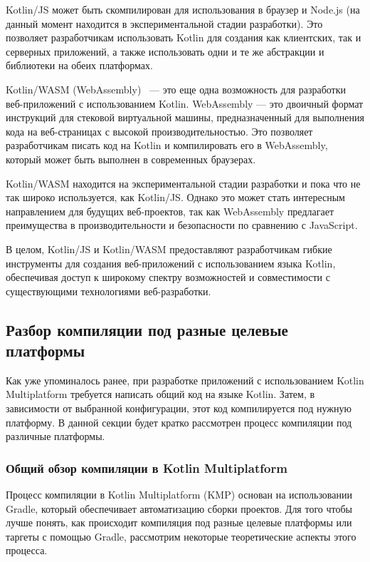 \documentclass[14pt, russian]{scrartcl}
\begin{document}
Kotlin/JS может быть скомпилирован для использования в браузер и Node.js (на данный момент находится в экспериментальной стадии разработки). Это позволяет разработчикам использовать Kotlin для создания как клиентских, так и серверных приложений, а также использовать одни и те же абстракции и библиотеки на обеих платформах.

Kotlin/WASM (WebAssembly)~\cite{KotlinWASM} --- это еще одна возможность для разработки веб-приложений с использованием Kotlin. WebAssembly --- это двоичный формат инструкций для стековой виртуальной машины, предназначенный для выполнения кода на веб-страницах с высокой производительностью. Это позволяет разработчикам писать код на Kotlin и компилировать его в WebAssembly, который может быть выполнен в современных браузерах.

Kotlin/WASM находится на экспериментальной стадии разработки и пока что не так широко используется, как Kotlin/JS. Однако это может стать интересным направлением для будущих веб-проектов, так как WebAssembly предлагает преимущества в производительности и безопасности по сравнению с JavaScript.

В целом, Kotlin/JS и Kotlin/WASM предоставляют разработчикам гибкие инструменты для создания веб-приложений с использованием языка Kotlin, обеспечивая доступ к широкому спектру возможностей и совместимости с существующими технологиями веб-разработки.

\subsection{Разбор компиляции под разные целевые платформы}

Как уже упоминалось ранее, при разработке приложений с использованием Kotlin Multiplatform требуется написать общий код на языке Kotlin. Затем, в зависимости от выбранной конфигурации, этот код компилируется под нужную платформу. В данной секции будет кратко рассмотрен процесс компиляции под различные платформы.

\subsubsection{Общий обзор компиляции в Kotlin Multiplatform}

Процесс компиляции в Kotlin Multiplatform (KMP) основан на использовании Gradle, который обеспечивает автоматизацию сборки проектов. Для того чтобы лучше понять, как происходит компиляция под разные целевые платформы или таргеты с помощью Gradle, рассмотрим некоторые теоретические аспекты этого процесса.
\end{document}
